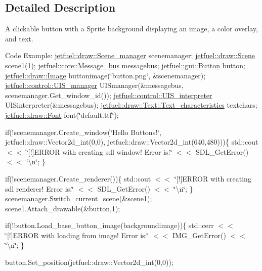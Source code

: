 \subsection{Detailed Description}
A clickable button with a Sprite background displaying an image, a color overlay, and text.

Code Example\+: \hyperlink{classjetfuel_1_1draw_1_1Scene__manager}{jetfuel\+::draw\+::\+Scene\+\_\+manager} scenemanager; \hyperlink{classjetfuel_1_1draw_1_1Scene}{jetfuel\+::draw\+::\+Scene} scene1(1); \hyperlink{classjetfuel_1_1core_1_1Message__bus}{jetfuel\+::core\+::\+Message\+\_\+bus} messagebus; \hyperlink{classjetfuel_1_1gui_1_1Button}{jetfuel\+::gui\+::\+Button} button; \hyperlink{classjetfuel_1_1draw_1_1Image}{jetfuel\+::draw\+::\+Image} buttonimage(\char`\"{}button.\+png\char`\"{}, \&scenemanager); \hyperlink{classjetfuel_1_1control_1_1UIS__manager}{jetfuel\+::control\+::\+U\+I\+S\+\_\+manager} U\+I\+Smanager(\&messagebus, scenemanager.\+Get\+\_\+window\+\_\+id()); \hyperlink{classjetfuel_1_1control_1_1UIS__interpreter}{jetfuel\+::control\+::\+U\+I\+S\+\_\+interpreter} U\+I\+Sinterpreter(\&messagebus); \hyperlink{structjetfuel_1_1draw_1_1Text_1_1Text__characteristics}{jetfuel\+::draw\+::\+Text\+::\+Text\+\_\+characteristics} textchars; \hyperlink{classjetfuel_1_1draw_1_1Font}{jetfuel\+::draw\+::\+Font} font(\char`\"{}default.\+ttf\char`\"{});

if(!scenemanager.Create\+\_\+window(\char`\"{}\+Hello Buttons!\char`\"{}, jetfuel\+::draw\+::\+Vector2d\+\_\+int(0,0), jetfuel\+::draw\+::\+Vector2d\+\_\+int(640,480)))\{ std\+::cout $<$$<$ \char`\"{}\mbox{[}!\mbox{]}\+E\+R\+R\+O\+R with creating sdl window! Error is\+:\char`\"{} $<$$<$ S\+D\+L\+\_\+\+Get\+Error() $<$$<$ \char`\"{}\textbackslash{}n\char`\"{}; \}

if(!scenemanager.Create\+\_\+renderer())\{ std\+::cout $<$$<$ \char`\"{}\mbox{[}!\mbox{]}\+E\+R\+R\+O\+R with creating sdl renderer! Error is\+:\char`\"{} $<$$<$ S\+D\+L\+\_\+\+Get\+Error() $<$$<$ \char`\"{}\textbackslash{}n\char`\"{}; \} scenemanager.\+Switch\+\_\+current\+\_\+scene(\&scene1); scene1.\+Attach\+\_\+drawable(\&button,1);

if(!button.Load\+\_\+base\+\_\+button\+\_\+image(backgroundimage))\{ std\+::cerr $<$$<$ \char`\"{}\mbox{[}!\mbox{]}\+E\+R\+R\+O\+R with loading from image! Error is\+:\char`\"{} $<$$<$ I\+M\+G\+\_\+\+Get\+Error() $<$$<$ \char`\"{}\textbackslash{}n\char`\"{}; \}

button.\+Set\+\_\+position(jetfuel\+::draw\+::\+Vector2d\+\_\+int(0,0));

